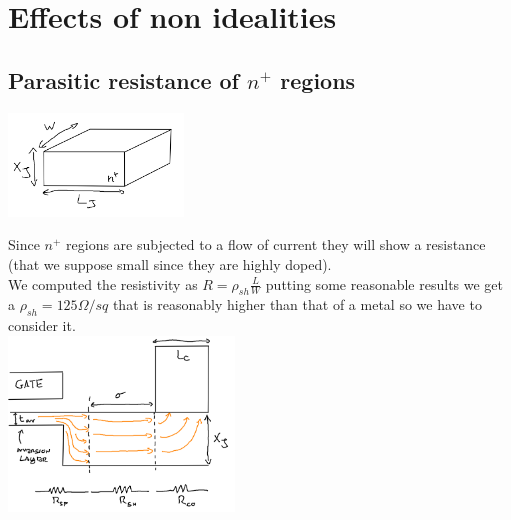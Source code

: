 \section{Effects of non idealities}

\subsection{Parasitic resistance of $n^+$ regions}


\centering
\includegraphics[width=0.35\textwidth]{parasR1.png}\\
\raggedright

Since $n^+$ regions are subjected to a flow of current they will show a resistance (that we suppose small since they are highly doped).\\
We computed the resistivity as $R=\rho_{sh}\frac{L}{W}$ putting some reasonable results we get a $\rho_{sh}=125 \Omega/sq$ that is reasonably higher than that of a metal so we have to consider it.\\


\centering
\includegraphics[width=0.45\textwidth]{parasR2.png}\\
\raggedright


